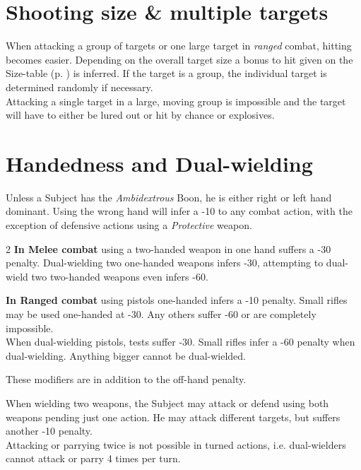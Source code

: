 \section{Shooting size \& multiple targets}
When attacking a group of targets or one large target in \emph{ranged} combat,
	hitting becomes easier.
Depending on the overall target size a bonus to hit given on the Size-table (p. \pageref{sizestable}) is inferred.
If the target is a group, the individual target is determined randomly if necessary.\\
Attacking a single target in a large, moving group is impossible and the target will have to either be lured out or hit by chance or explosives.
\section{Handedness and Dual-wielding}
Unless a Subject has the \emph{Ambidextrous} Boon,
he is either right or left hand dominant.
Using the wrong hand will infer a -10 to any combat action,
with the exception of defensive actions using a \emph{Protective} weapon.
\begin{multicols}{2}
	\textbf{In Melee combat} using a two-handed weapon in one hand suffers a -30 penalty.
	Dual-wielding two one-handed weapons infers -30,
	attempting to dual-wield two two-handed weapons even infers -60.
	\par%
	\columnbreak
	\textbf{In Ranged combat} using pistols one-handed infers a -10 penalty.
	Small rifles may be used one-handed at -30.
	Any others suffer -60 or are completely impossible.
	\\%
	When dual-wielding pistols, tests suffer -30.
	Small rifles infer a -60 penalty when dual-wielding.
	Anything bigger cannot be dual-wielded.
\end{multicols}
These modifiers are in addition to the off-hand penalty.
\par%
When wielding two weapons,
the Subject may attack or defend using both weapons pending just one action.
He may attack different targets,
but suffers another -10 penalty.\\
Attacking or parrying twice is not possible in turned actions,
	i.e. dual-wielders cannot attack or parry 4 times per turn.
